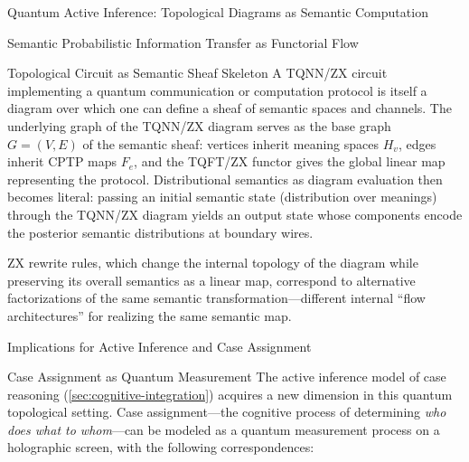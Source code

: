 \documentclass[
  ignorenonframetext,
]{beamer}
\begin{document}
\begin{frame}{Quantum Active Inference: Topological Diagrams as Semantic
Computation}
\begin{block}{Semantic Probabilistic Information Transfer as Functorial
Flow}
\begin{block}{Topological Circuit as Semantic Sheaf Skeleton}
\protect{}\label{topological-circuit-as-semantic-sheaf-skeleton}
A TQNN/ZX circuit implementing a quantum communication or computation
protocol is itself a diagram over which one can define a sheaf of
semantic spaces and channels. The underlying graph of the TQNN/ZX
diagram serves as the base graph \(G=(V,E)\) of the semantic sheaf:
vertices inherit meaning spaces \(H_v\), edges inherit CPTP maps
\(F_e\), and the TQFT/ZX functor gives the global linear map
representing the protocol. Distributional semantics as diagram
evaluation then becomes literal: passing an initial semantic state
(distribution over meanings) through the TQNN/ZX diagram yields an
output state whose components encode the posterior semantic
distributions at boundary wires.

ZX rewrite rules, which change the internal topology of the diagram
while preserving its overall semantics as a linear map, correspond to
alternative factorizations of the same semantic
transformation---different internal ``flow architectures'' for realizing
the same semantic map.
\end{block}
\end{block}

\begin{block}{Implications for Active Inference and Case Assignment}
\protect{}\label{implications-for-active-inference-and-case-assignment}
\begin{block}{Case Assignment as Quantum Measurement}
\protect{}\label{case-assignment-as-quantum-measurement}
The active inference model of case reasoning
(\autoref{sec:cognitive-integration}) acquires a new dimension in this
quantum topological setting. Case assignment---the cognitive process of
determining \emph{who does what to whom}---can be modeled as a quantum
measurement process on a holographic screen, with the following
correspondences:


\end{block}
\end{block}
\end{frame}
\end{document}
